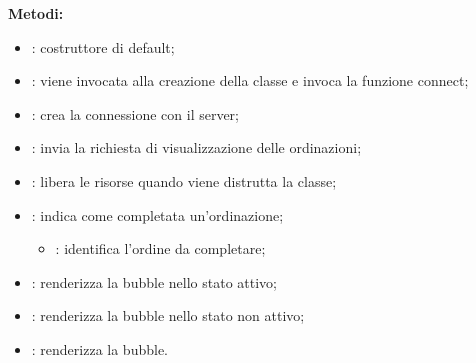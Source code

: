 \textbf{Metodi:}
\begin{itemize}
	\item {}: costruttore di default;
	\item {}: viene invocata alla creazione della classe e invoca la funzione connect;
	\item {}: crea la connessione con il server;
	\item {}: invia la richiesta di visualizzazione delle ordinazioni;
	\item {}: libera le risorse quando viene distrutta la classe;
	\item {}: indica come completata un'ordinazione;
		\begin{itemize}
			\item {}: identifica l'ordine da completare;
		\end{itemize}
	\item {}: renderizza la bubble nello stato attivo;
	\item {}: renderizza la bubble nello stato non attivo;
	\item {}: renderizza la bubble.
\end{itemize}


